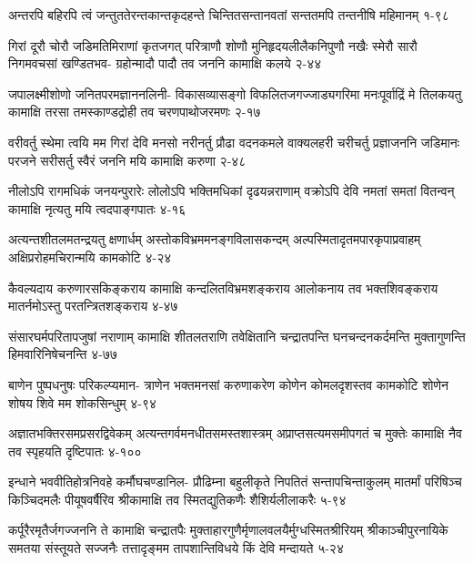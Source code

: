 \annotwolineshloka
{अन्तरपि बहिरपि त्वं जन्तुततेरन्तकान्तकृदहन्ते}
{चिन्तितसन्तानवतां सन्ततमपि तन्तनीषि महिमानम्}
{१-९८}

\annofourlineindentedshloka
{गिरां दूरौ चोरौ जडिमतिमिराणां कृतजगत्}
{परित्राणौ शोणौ मुनिहृदयलीलैकनिपुणौ}
{नखैः स्मेरौ सारौ निगमवचसां खण्डितभव-}
{ग्रहोन्मादौ पादौ तव जननि कामाक्षि कलये}
{२-४४}

\annofourlineindentedshloka
{जपालक्ष्मीशोणो जनितपरमज्ञाननलिनी-}
{विकासव्यासङ्गो विफलितजगज्जाड्यगरिमा}
{मनःपूर्वाद्रिं मे तिलकयतु कामाक्षि तरसा}
{तमस्काण्डद्रोही तव चरणपाथोजरमणः}
{२-१७}

\annofourlineindentedshloka
{वरीवर्तु स्थेमा त्वयि मम गिरां देवि मनसो}
{नरीनर्तु प्रौढा वदनकमले वाक्यलहरी}
{चरीचर्तु प्रज्ञाजननि जडिमानः परजने}
{सरीसर्तु स्वैरं जननि मयि कामाक्षि करुणा}
{२-४८}

\annofourlineindentedshloka
{नीलोऽपि रागमधिकं जनयन्पुरारेः}
{लोलोऽपि भक्तिमधिकां दृढयन्नराणाम्}
{वक्रोऽपि देवि नमतां समतां वितन्वन्}
{कामाक्षि नृत्यतु मयि त्वदपाङ्गपातः}
{४-१६}

\annofourlineindentedshloka
{अत्यन्तशीतलमतन्द्रयतु क्षणार्धम्}
{अस्तोकविभ्रममनङ्गविलासकन्दम्}
{अल्पस्मितादृतमपारकृपाप्रवाहम्}
{अक्षिप्ररोहमचिरान्मयि कामकोटि}
{४-२४}

\annofourlineindentedshloka
{कैवल्यदाय करुणारसकिङ्कराय}
{कामाक्षि कन्दलितविभ्रमशङ्कराय}
{आलोकनाय तव भक्तशिवङ्कराय}
{मातर्नमोऽस्तु परतन्त्रितशङ्कराय}
{४-४७}

\annofourlineindentedshloka
{संसारघर्मपरितापजुषां नराणाम्}
{कामाक्षि शीतलतराणि तवेक्षितानि}
{चन्द्रातपन्ति घनचन्दनकर्दमन्ति}
{मुक्तागुणन्ति हिमवारिनिषेचनन्ति}
{४-७७}

\annofourlineindentedshloka
{बाणेन पुष्पधनुषः परिकल्प्यमान-}
{त्राणेन भक्तमनसां करुणाकरेण}
{कोणेन कोमलदृशस्तव कामकोटि}
{शोणेन शोषय शिवे मम शोकसिन्धुम्}
{४-९४}

\annofourlineindentedshloka
{अज्ञातभक्तिरसमप्रसरद्विवेकम्}
{अत्यन्तगर्वमनधीतसमस्तशास्त्रम्}
{अप्राप्तसत्यमसमीपगतं च मुक्तेः}
{कामाक्षि नैव तव स्पृहयति दृष्टिपातः}
{४-१००}%

\annofourlineindentedshloka
{इन्धाने भववीतिहोत्रनिवहे कर्मौघचण्डानिल-}
{प्रौढिम्ना बहुलीकृते निपतितं सन्तापचिन्ताकुलम्}
{मातर्मां परिषिञ्च किञ्चिदमलैः पीयूषवर्षैरिव}
{श्रीकामाक्षि तव स्मितद्युतिकणैः शैशिर्यलीलाकरैः}
{५-९४}

\annofourlineindentedshloka
{कर्पूरैरमृतैर्जगज्जननि ते कामाक्षि चन्द्रातपैः}
{मुक्ताहारगुणैर्मृणालवलयैर्मुग्धस्मितश्रीरियम्}
{श्रीकाञ्चीपुरनायिके समतया संस्तूयते सज्जनैः}
{तत्तादृङ्मम तापशान्तिविधये किं देवि मन्दायते}
{५-२४}

